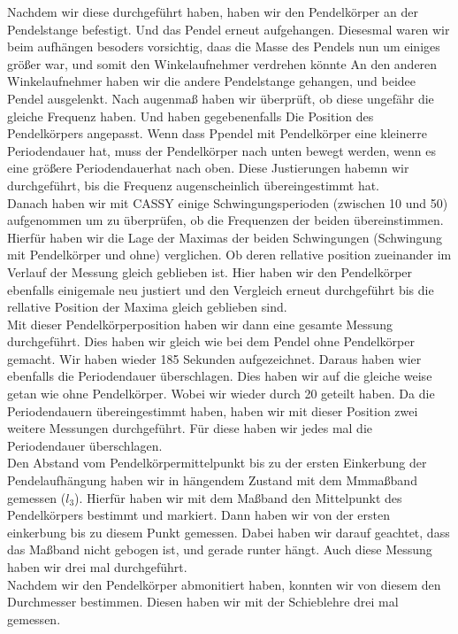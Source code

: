 \documentclass[twoside]{protokoll}
\begin{document}
Nachdem wir diese durchgeführt haben, haben wir den Pendelkörper an der Pendelstange befestigt. 
Und das Pendel erneut aufgehangen. 
Diesesmal waren wir beim aufhängen besoders vorsichtig, daas die Masse des Pendels nun um einiges größer war, und somit den Winkelaufnehmer verdrehen könnte
An den anderen Winkelaufnehmer haben wir die andere Pendelstange gehangen, und beidee Pendel ausgelenkt.
Nach augenmaß haben wir überprüft, ob diese ungefähr die gleiche Frequenz haben. Und haben gegebenenfalls Die Position des Pendelkörpers angepasst.
Wenn dass Ppendel mit Pendelkörper eine kleinerre Periodendauer hat, muss der Pendelkörper nach unten bewegt werden, wenn es eine größere Periodendauerhat nach oben.
Diese Justierungen habemn wir durchgeführt, bis die Frequenz augenscheinlich übereingestimmt hat. \\

Danach haben wir mit CASSY einige Schwingungsperioden (zwischen 10 und 50) aufgenommen um zu überprüfen, ob die Frequenzen der beiden übereinstimmen. 
Hierfür haben wir die Lage der Maximas der beiden Schwingungen (Schwingung mit Pendelkörper und ohne) verglichen.
Ob deren rellative position zueinander im Verlauf der Messung gleich geblieben ist.
Hier haben wir den Pendelkörper ebenfalls einigemale neu justiert und den Vergleich erneut durchgeführt bis die rellative Position der Maxima gleich geblieben sind.\\

Mit dieser Pendelkörperposition haben wir dann eine gesamte Messung durchgeführt.
Dies haben wir gleich wie bei dem Pendel ohne Pendelkörper gemacht. Wir haben wieder 185 Sekunden aufgezeichnet. 
Daraus haben wier ebenfalls die Periodendauer überschlagen. 
Dies haben wir auf die gleiche weise getan wie ohne Pendelkörper. Wobei wir wieder durch 20 geteilt haben.
Da die Periodendauern übereingestimmt haben, haben wir mit dieser Position zwei weitere Messungen durchgeführt.
Für diese haben wir jedes mal die Periodendauer überschlagen.\\

Den Abstand vom Pendelkörpermittelpunkt bis zu der ersten Einkerbung der Pendelaufhängung haben wir in hängendem Zustand mit dem Mmmaßband gemessen ($l_3$).
Hierfür haben wir mit dem Maßband den Mittelpunkt des Pendelkörpers bestimmt und markiert. Dann haben wir von der ersten einkerbung bis zu diesem Punkt gemessen.
Dabei haben wir darauf geachtet, dass das Maßband nicht gebogen ist, und gerade runter hängt. 
Auch diese Messung haben wir drei mal durchgeführt.\\
Nachdem wir den Pendelkörper abmonitiert haben, konnten wir von diesem den Durchmesser bestimmen.
Diesen haben wir mit der Schieblehre drei mal gemessen.\\
\end{document}
